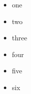 \documentclass{article}
\begin{document}
\begin{itemize}

	\item one
	\item two
	\item three
	\item four
	\item five 
	\item six

\end{itemize}
\end{document}
